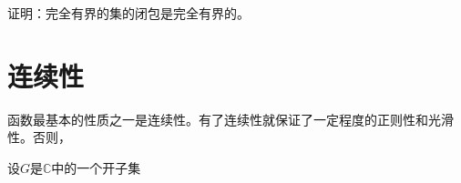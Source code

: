\begin{exercise}
证明：完全有界的集的闭包是完全有界的。
\end{exercise}



\section{连续性}\label{section0020205}
函数最基本的性质之一是连续性。有了连续性就保证了一定程度的正则性和光滑性。否则，


\begin{exercise}\label{exer002020507}
设$G$是$\mathbb{C}$中的一个开子集
\end{exercise}





